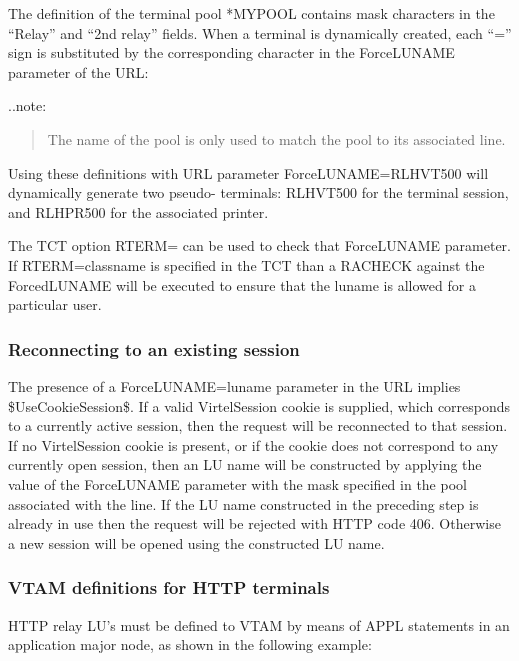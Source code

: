 \documentclass[letterpaper,10pt,english]{sphinxmanual}
\begin{document}
The definition of the terminal pool *MYPOOL contains mask characters in the “Relay” and “2nd relay” fields. When a terminal is dynamically created, each “=” sign is substituted by the corresponding character in the ForceLUNAME parameter of the URL:



..note:
\begin{quote}

The name of the pool is only used to match the pool to its associated line.
\end{quote}

Using these definitions with URL parameter ForceLUNAME=RLHVT500 will dynamically generate two pseudo- terminals: RLHVT500 for the terminal session, and RLHPR500 for the associated printer.

The TCT option RTERM= can be used to check that ForceLUNAME parameter. If RTERM=classname is specified in the TCT than a RACHECK against the ForcedLUNAME will be executed to ensure that the luname is allowed for a particular user.


\subsubsection{Reconnecting to an existing session}
\label{\detokenize{connectivity_guide:reconnecting-to-an-existing-session}}
The presence of a ForceLUNAME=luname parameter in the URL implies \$UseCookieSession\$. If a valid VirtelSession cookie is supplied, which corresponds to a currently active session, then the request will be reconnected to that session. If no VirtelSession cookie is present, or if the cookie does not correspond to any currently open session, then an LU name will be constructed by applying the value of the ForceLUNAME parameter with the mask specified in the pool associated with the line. If the LU name constructed in the preceding step is already in use then the request will be rejected with HTTP code 406. Otherwise a new session will be opened using the constructed LU name.


\subsubsection{VTAM definitions for HTTP terminals}
\label{\detokenize{connectivity_guide:vtam-definitions-for-http-terminals}}
HTTP relay LU’s must be defined to VTAM by means of APPL statements in an application major node, as shown in the following example:
\end{document}
